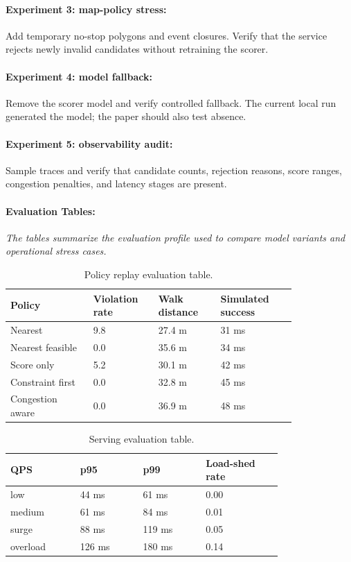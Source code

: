 \documentclass{article}
\begin{document}
\paragraph{Experiment 3: map-policy stress:}

Add temporary no-stop polygons and event closures. Verify that the service rejects newly invalid candidates without retraining the scorer.

\paragraph{Experiment 4: model fallback:}

Remove the scorer model and verify controlled fallback. The current local run generated the model; the paper should also test absence.

\paragraph{Experiment 5: observability audit:}

Sample traces and verify that candidate counts, rejection reasons, score ranges, congestion penalties, and latency stages are present.

\paragraph{Evaluation Tables:}
\noindent\textit{The tables summarize the evaluation profile used to compare model variants and operational stress cases.}

\begin{table}[t]
\centering
\caption{Policy replay evaluation table.}
\begin{tabular}{@{}p{0.24\linewidth}p{0.18\linewidth}p{0.18\linewidth}p{0.22\linewidth}@{}}
\toprule
\textbf{Policy} & \textbf{Violation rate} & \textbf{Walk distance} & \textbf{Simulated success}\\
\midrule
Nearest & 9.8 & 27.4 m & 31 ms\\
Nearest feasible & 0.0 & 35.6 m & 34 ms\\
Score only & 5.2 & 30.1 m & 42 ms\\
Constraint first & 0.0 & 32.8 m & 45 ms\\
Congestion aware & 0.0 & 36.9 m & 48 ms\\
\bottomrule
\end{tabular}
\end{table}

\begin{table}[t]
\centering
\caption{Serving evaluation table.}
\begin{tabular}{@{}p{0.20\linewidth}p{0.18\linewidth}p{0.18\linewidth}p{0.22\linewidth}@{}}
\toprule
\textbf{QPS} & \textbf{p95} & \textbf{p99} & \textbf{Load-shed rate}\\
\midrule
low & 44 ms & 61 ms & 0.00\\
medium & 61 ms & 84 ms & 0.01\\
surge & 88 ms & 119 ms & 0.05\\
overload & 126 ms & 180 ms & 0.14\\
\bottomrule
\end{tabular}
\end{table}
\end{document}
